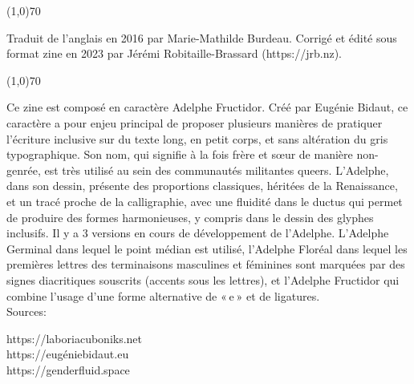 \begin{center}
\line(1,0){70}
\end{center}
\singlespacing
\quote \footnotesize Traduit de l’anglais en 2016 par Marie-Mathilde Burdeau. Corrigé et édité sous format zine en 2023 par Jérémi Robitaille-Brassard ({\selectfont https://jrb.nz}).

\begin{center}
\line(1,0){70}
\end{center}

\footnotesize Ce zine est composé en caractère Adelphe Fructidor. Créé par Eugénie Bidaut, ce caractère a pour enjeu principal de proposer plusieurs manières de pratiquer l’écriture inclusive sur du texte long, en petit corps, et sans altération du gris typographique. Son nom, qui signifie à la fois frère et sœur de manière non-genrée, est très utilisé au sein des communautés militantes queers. L’Adelphe, dans son dessin, présente des proportions classiques, héritées de la Renaissance, et un tracé proche de la calligraphie, avec une fluidité dans le ductus qui permet de produire des formes harmonieuses, y compris dans le dessin des glyphes inclusifs. Il y a 3 versions en cours de développement de l’Adelphe. L’Adelphe Germinal dans lequel le point médian est utilisé, l’Adelphe Floréal dans lequel les premières lettres des terminaisons masculines et féminines sont marquées par des signes diacritiques souscrits (accents sous les lettres), et l’Adelphe Fructidor qui combine l’usage d’une forme alternative de « e » et de ligatures. \\

Sources:

{\selectfont https://laboriacuboniks.net \\ https://eugéniebidaut.eu \\ https://genderfluid.space }

